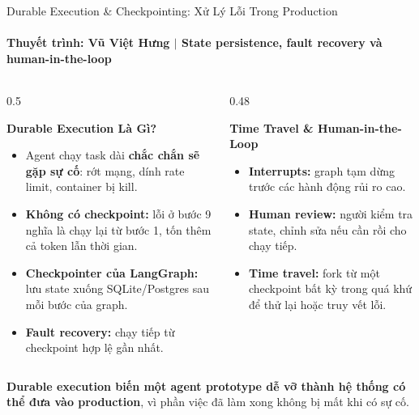 \documentclass[aspectratio=1610,10pt,xcolor={table}]{beamer}
\begin{document}
\begin{frame}{Durable Execution \& Checkpointing: Xử Lý Lỗi Trong Production}
  \framesubtitle{Thuyết trình: Vũ Việt Hưng $\vert$ State persistence, fault recovery và human-in-the-loop}

  \begin{columns}[t]
    \begin{column}{0.5\textwidth}
      \begin{block}{\textbf{Durable Execution Là Gì?}}
        \scriptsize
        \begin{itemize}
          \item Agent chạy task dài \textbf{chắc chắn sẽ gặp sự cố}: rớt mạng, dính rate limit, container bị kill.
          \item \textbf{Không có checkpoint:} lỗi ở bước 9 nghĩa là chạy lại từ bước 1, tốn thêm cả token lẫn thời gian.
          \item \textbf{Checkpointer của LangGraph:} lưu state xuống SQLite/Postgres sau mỗi bước của graph.
          \item \textbf{Fault recovery:} chạy tiếp từ checkpoint hợp lệ gần nhất.
        \end{itemize}
      \end{block}
    \end{column}

    \begin{column}{0.48\textwidth}
      \begin{alertblock}{\textbf{Time Travel \& Human-in-the-Loop}}
        \scriptsize
        \begin{itemize}
          \item \textbf{Interrupts:} graph tạm dừng trước các hành động rủi ro cao.
          \item \textbf{Human review:} người kiểm tra state, chỉnh sửa nếu cần rồi cho chạy tiếp.
          \item \textbf{Time travel:} fork từ một checkpoint bất kỳ trong quá khứ để thử lại hoặc truy vết lỗi.
        \end{itemize}
      \end{alertblock}
    \end{column}
  \end{columns}

  \vspace{0.15cm}
  \begin{tcolorbox}[colback=boxbg,colframe=darkgreen,title={\textbf{Bài Học Theo Đề Cương}},fonttitle=\footnotesize\bfseries]
    \footnotesize \textbf{Durable execution biến một agent prototype dễ vỡ thành hệ thống có thể đưa vào production}, vì phần việc đã làm xong không bị mất khi có sự cố.
  \end{tcolorbox}
\end{frame}
\end{document}
